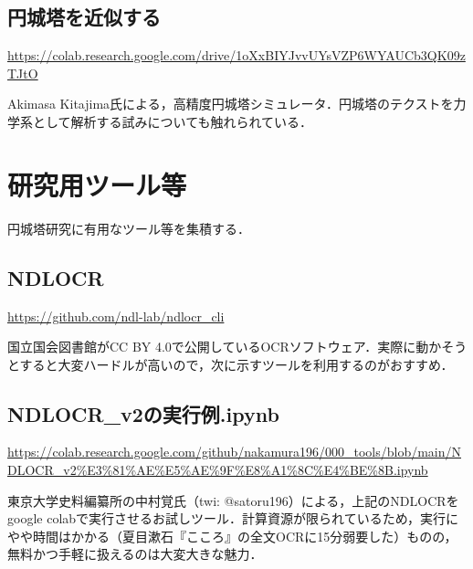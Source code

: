 \documentclass[10pt, a5paper, twoside]{jsarticle}
\theoremstyle{definition}
\begin{document}
		\subsection{円城塔を近似する}

			\url{https://colab.research.google.com/drive/1oXxBIYJvvUYsVZP6WYAUCb3QK09zTJtO}

			Akimasa Kitajima氏による，高精度円城塔シミュレータ．円城塔のテクストを力学系として解析する試みについても触れられている．

	\section{研究用ツール等}

		円城塔研究に有用なツール等を集積する．

		\subsection{NDLOCR}

			\url{https://github.com/ndl-lab/ndlocr_cli}

			国立国会図書館がCC BY 4.0で公開しているOCRソフトウェア．実際に動かそうとすると大変ハードルが高いので，次に示すツールを利用するのがおすすめ．

		\subsection{NDLOCR\_v2の実行例.ipynb}

			\url{https://colab.research.google.com/github/nakamura196/000_tools/blob/main/NDLOCR_v2%E3%81%AE%E5%AE%9F%E8%A1%8C%E4%BE%8B.ipynb}

			東京大学史料編纂所の中村覚氏（twi: @satoru196）による，上記のNDLOCRをgoogle colabで実行させるお試しツール．計算資源が限られているため，実行にやや時間はかかる（夏目漱石『こころ』の全文OCRに15分弱要した）ものの，無料かつ手軽に扱えるのは大変大きな魅力．
\end{document}
